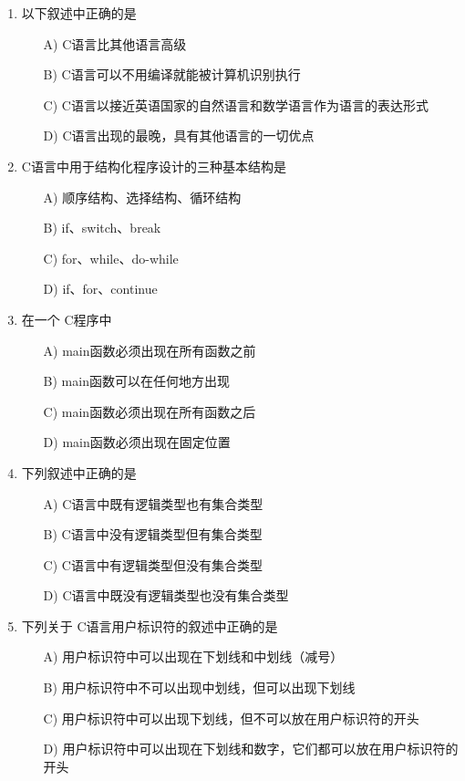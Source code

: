 \documentclass[12pt,a4paper]{article}
\begin{document}
\begin{enumerate}
    \item 以下叙述中正确的是
    \begin{enumerate}
        \item[A)] C语言比其他语言高级
        \item[B)] C语言可以不用编译就能被计算机识别执行
        \item[C)] C语言以接近英语国家的自然语言和数学语言作为语言的表达形式
        \item[D)] C语言出现的最晚，具有其他语言的一切优点
    \end{enumerate}
    
    \item C语言中用于结构化程序设计的三种基本结构是
    \begin{enumerate}
        \item[A)] 顺序结构、选择结构、循环结构
        \item[B)] if、switch、break
        \item[C)] for、while、do-while
        \item[D)] if、for、continue
    \end{enumerate}
    
    \item 在一个 C程序中
    \begin{enumerate}
        \item[A)] main函数必须出现在所有函数之前
        \item[B)] main函数可以在任何地方出现
        \item[C)] main函数必须出现在所有函数之后
        \item[D)] main函数必须出现在固定位置
    \end{enumerate}
    
    \item 下列叙述中正确的是
    \begin{enumerate}
        \item[A)] C语言中既有逻辑类型也有集合类型
        \item[B)] C语言中没有逻辑类型但有集合类型
        \item[C)] C语言中有逻辑类型但没有集合类型
        \item[D)] C语言中既没有逻辑类型也没有集合类型
    \end{enumerate}
    
    \item 下列关于 C语言用户标识符的叙述中正确的是
    \begin{enumerate}
        \item[A)] 用户标识符中可以出现在下划线和中划线（减号）
        \item[B)] 用户标识符中不可以出现中划线，但可以出现下划线
        \item[C)] 用户标识符中可以出现下划线，但不可以放在用户标识符的开头
        \item[D)] 用户标识符中可以出现在下划线和数字，它们都可以放在用户标识符的开头
    \end{enumerate}
    

\end{enumerate}
\end{document}
